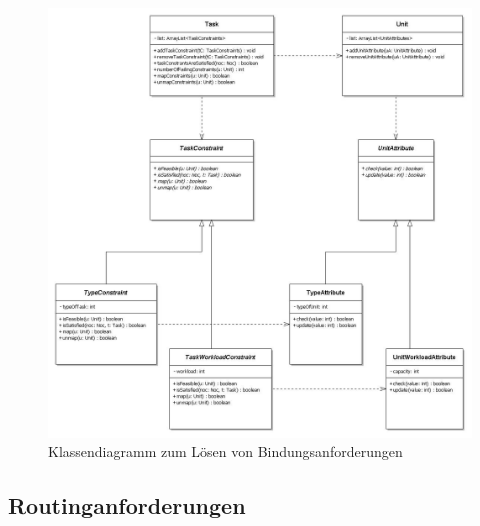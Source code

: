 \begin{figure}[H]\centering
  \includegraphics[width = 150mm]{bilder/task-unit.jpg}
  \caption{Klassendiagramm zum Lösen von Bindungsanforderungen}\label{fig:klBind}
\end{figure}

\subsection{Routinganforderungen}\label{routinganforderung}


